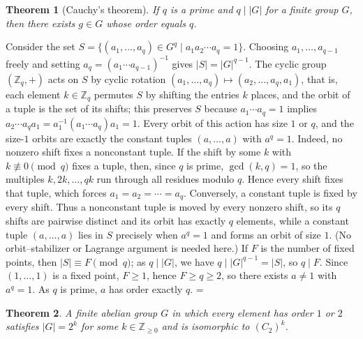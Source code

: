 \documentclass[11pt]{article}
\makeatletter
\theoremstyle{ntstyle}
\newtheorem{theorem}{Theorem}[subsection]
\let\nt@closedisplay\]
\def\nt@guardedclose{\@ifnextchar\par{\nt@closeafterpar}{\@ifnextchar\end{\postdisplaypenalty\@M\nt@closedisplay}{\nt@closedisplay}}}
\def\nt@closeafterpar\par{\@ifnextchar\par{\nt@closeafterpar}{\@ifnextchar\end{\postdisplaypenalty\@M\nt@closedisplay\par}{\nt@closedisplay\par}}}
\renewenvironment{proof}[1][\proofname]{\par
  \pushQED{\qed}\normalfont\topsep\medskipamount\edef\nt@afterproof{\@endparpenalty=\the\@endparpenalty\relax}\@beginparpenalty\@M\@endparpenalty\@M\let\]\nt@guardedclose\trivlist\item[]\textit{#1\@addpunct{.}} \ignorespaces}{\ifvmode\addpenalty\@M\fi\popQED\nt@afterproof\endtrivlist\@endpefalse}
\makeatother
\begin{document}
\begin{theorem}[Cauchy's theorem]\label{thm:6.7.1} If $q$ is a
	prime and $q \mid |G|$ for a finite group $G$, then there exists $g
		\in G$ whose order equals $q$.
\end{theorem}

\begin{proof} Consider the set $S = \{(a_1, \ldots, a_q)
		\in G^{q} \mid a_1 a_2 \cdots a_q = 1\}$. Choosing $a_1, \ldots,
		a_{q-1}$ freely and setting $a_q = (a_1 \cdots a_{q-1})^{-1}$ gives
	$|S| = |G|^{q-1}$. The cyclic group $(\mathbb{Z}_q,+)$ acts on $S$ by
	cyclic rotation $(a_1, \ldots, a_q) \mapsto (a_2, \ldots, a_q, a_1)$, that is, each element
	$k\in\mathbb{Z}_q$ permutes $S$ by shifting the entries $k$ places, and the orbit of a tuple is
	the set of its shifts;
	this preserves $S$ because $a_1 \cdots a_q = 1$ implies $a_2 \cdots
		a_q a_1 = a_1^{-1}(a_1 \cdots a_q)a_1 = 1$. Every orbit of this action
	has size $1$ or $q$, and the size-$1$ orbits are exactly the constant
	tuples $(a, \ldots, a)$ with $a^{q} = 1$. Indeed, no nonzero shift fixes
	a nonconstant tuple. If the shift
	by some $k$ with $k \not\equiv 0 \pmod{q}$ fixes a tuple, then, since $q$
	is prime, $\gcd(k, q) = 1$, so the multiples $k, 2k, \ldots, qk$ run
	through all residues modulo $q$. Hence every shift fixes that tuple,
	which forces $a_1 = a_2 = \cdots = a_q$. Conversely, a constant
	tuple is fixed by every shift. Thus a nonconstant tuple is moved by
	every nonzero shift, so its $q$ shifts are pairwise distinct and its
	orbit has exactly $q$ elements, while a constant tuple $(a, \ldots, a)$
	lies in $S$ precisely when $a^{q} = 1$ and forms an orbit of size $1$.
	(No orbit--stabilizer or Lagrange argument is needed here.) If $F$ is the
	number of fixed points, then $|S| \equiv F \pmod{q}$; as $q \mid |G|$,
	we have $q \mid |G|^{q-1} = |S|$, so $q \mid F$. Since $(1, \ldots,
		1)$ is a fixed point, $F \ge 1$, hence $F \ge q \ge 2$, so there
	exists $a \neq 1$ with $a^{q} = 1$. As $q$ is prime, $a$ has order
	exactly $q$.
\end{proof}
\begin{theorem}\label{thm:6.7.2} A finite abelian group $G$ in which
	every element has order $1$ or $2$ satisfies $|G| = 2^{k}$ for some
	$k\in\mathbb{Z}_{\ge0}$ and is isomorphic to $(C_2)^{k}$.
\end{theorem}
\end{document}
